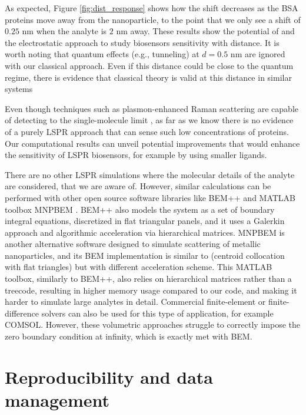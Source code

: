 As expected, Figure \ref{fig:dist_response} shows how the shift decreases as the BSA 
proteins move away from the nanoparticle, to the point that we only see a shift of 
$0.25$ nm when the analyte is $2$ nm away. These results show the potential of \pygbe 
and the electrostatic approach to study biosensors sensitivity with distance. It is 
worth noting that quantum effects (e.g., tunneling) at $d=0.5$ nm are ignored with 
our classical approach. Even if this distance could be close to the quantum regime, 
there is evidence that classical theory is valid at this distance in similar systems
\cite{SavageETal2012, EstebanETal2012}

Even though techniques such as plasmon-enhanced Raman 
scattering are capable of detecting to the single-molecule limit 
\cite{ZhangZhangETal2013}, as far as we know there is no evidence of a purely
LSPR approach that can sense such low concentrations of proteins. Our 
computational results can unveil potential improvements that would enhance 
the sensitivity of LSPR biosensors, for example by using smaller ligands. 

There are no other LSPR simulations where the molecular details of the analyte 
are considered, that we are aware of. However, similar calculations can be 
performed with other open source software libraries like BEM++ \cite{SmigajETal2015} and 
MATLAB toolbox MNPBEM \cite{HohenesterTrugler2012}. BEM++ also models the system
as a set of boundary integral equations, discretized in flat triangular panels, 
and it uses a Galerkin approach and algorithmic acceleration via hierarchical 
matrices. MNPBEM is another alternative software designed to simulate scattering
of metallic nanoparticles, and its BEM implementation is similar to \pygbe 
(centroid collocation with flat triangles) but with different acceleration scheme.
This MATLAB toolbox, similarly to BEM++, also relies on hierarchical matrices 
rather than a treecode, resulting in higher memory usage compared to our code, 
and making it harder to simulate large analytes in detail. 
Commercial finite-element or finite-difference solvers can also be used for this
type of application, for example COMSOL. However, these volumetric approaches 
struggle to correctly impose the zero boundary condition at infinity, which is
exactly met with BEM.  

\section{Reproducibility and data management} \label{sec:repro_lspr}

